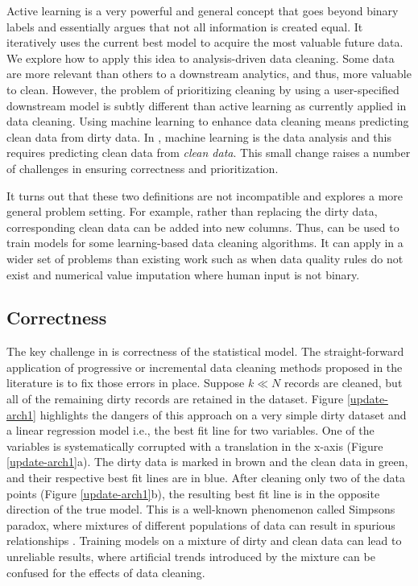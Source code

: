 Active learning is a very powerful and general concept that goes beyond binary labels and essentially argues that not all information is created equal.
It iteratively uses the current best model to acquire the most valuable future data.
We explore how to apply this idea to analysis-driven data cleaning. 
Some data are more relevant than others to a downstream analytics, and thus, more valuable to clean.
However, the problem of prioritizing cleaning by using a user-specified downstream model is subtly different than active learning as currently applied in data cleaning.
Using machine learning to enhance data cleaning means predicting clean data from dirty data.
In \sys, machine learning is the data analysis and this requires predicting clean data from \emph{clean data}.
This small change raises a number of challenges in ensuring correctness and prioritization.

It turns out that these two definitions are not incompatible and \sys explores a more general problem setting.
For example, rather than replacing the dirty data, corresponding clean data can be added into new columns. 
Thus, \sys can be used to train models for some learning-based data cleaning algorithms.
It can apply in a wider set of problems than existing work such as when data quality rules do not exist and numerical value imputation where human input is not binary.

\subsection{Correctness}  
The key challenge in \sys is correctness of the statistical model.
The straight-forward application of progressive or incremental data cleaning methods proposed in the literature is to fix those errors in place.
Suppose $k \ll N$ records are cleaned, but all of the remaining dirty records are retained in the dataset.
Figure \ref{update-arch1} highlights the dangers of this approach on a very simple dirty dataset and a linear regression model i.e., the best fit line for two variables. 
One of the variables is systematically corrupted with a translation in the x-axis (Figure \ref{update-arch1}a).
The dirty data is marked in brown and the clean data in green, and their respective best fit lines are in blue.
After cleaning only two of the data points (Figure \ref{update-arch1}b), the resulting best fit line is in the opposite direction of the true model.
This is a well-known phenomenon called Simpsons paradox, where mixtures of different populations of data can result in spurious relationships \cite{simpson1951interpretation}.
Training models on a mixture of dirty and clean data can lead to unreliable results, where artificial trends introduced by the mixture can be confused for the effects of data cleaning.

